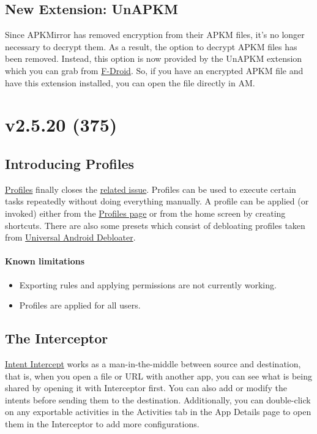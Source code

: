 \subsection{New Extension: UnAPKM}
Since APKMirror has removed encryption from their APKM files, it's no longer necessary to decrypt them.
As a result, the option to decrypt APKM files has been removed.
Instead, this option is now provided by the UnAPKM extension which you can grab from \href{https://f-droid.org/packages/io.github.muntashirakon.unapkm/}{F-Droid}.
So, if you have an encrypted APKM file and have this extension installed, you can open the file directly in AM\@.


\section{v2.5.20 (375)}\label{sec:v2.5.20-(375)}

\subsection{Introducing Profiles}\label{subsec:introducing-profiles}
\hyperref[sec:profile-page]{Profiles} finally closes the
\href{https://github.com/MuntashirAkon/AppManager/issues/72}{related issue}. Profiles can be used to execute certain
tasks repeatedly without doing everything manually. A profile can be applied (or invoked) either from the
\hyperref[sec:profiles-page]{Profiles page} or from the home screen by creating shortcuts. There are also some presets
which consist of debloating profiles taken from
\href{https://gitlab.com/W1nst0n/universal-android-debloater}{Universal Android Debloater}.

\paragraph{Known limitations}
\begin{itemize}
    \item Exporting rules and applying permissions are not currently working.
    \item Profiles are applied for all users.
\end{itemize}

\subsection{The Interceptor}\label{subsec:the-interceptor}
\href{https://github.com/MuntashirAkon/intent-intercept}{Intent Intercept} works as a man-in-the-middle between source
and destination, that is, when you open a file or URL with another app, you can see what is being shared by opening it
with Interceptor first. You can also add or modify the intents before sending them to the destination. Additionally,
you can double-click on any exportable activities in the Activities tab in the App Details page to open them in the
Interceptor to add more configurations.


